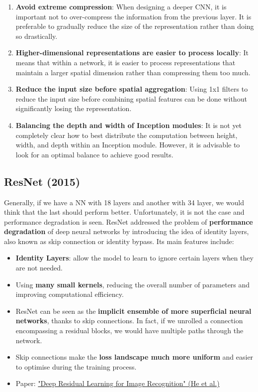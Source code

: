 \begin{enumerate}
    \item \textbf{Avoid extreme compression}: When designing a deeper CNN, it is important not to over-compress the information from the previous layer. It is preferable to gradually reduce the size of the representation rather than doing so drastically.

    \item \textbf{Higher-dimensional representations are easier to process locally}: It means that within a network, it is easier to process representations that maintain a larger spatial dimension rather than compressing them too much.

    \item \textbf{Reduce the input size before spatial aggregation}: Using 1x1 filters to reduce the input size before combining spatial features can be done without significantly losing the representation.

    \item \textbf{Balancing the depth and width of Inception modules}: It is not yet completely clear how to best distribute the computation between height, width, and depth within an Inception module. However, it is advisable to look for an optimal balance to achieve good results.
\end{enumerate}

\subsection{ResNet (2015)}

Generally, if we have a NN with 18 layers and another with 34 layer, we would think that the last should perform better. Unfortunately, it is not the case and performance degradation is seen. ResNet addressed the problem of \textbf{performance degradation} of deep neural networks by introducing the idea of identity layers, also known as skip connection or identity bypass. Its main features include:
\begin{itemize}
    \item \textbf{Identity Layers}: allow the model to learn to ignore certain layers when they are not needed.
    \item Using \textbf{many small kernels}, reducing the overall number of parameters and improving computational efficiency.
    \item ResNet can be seen as the \textbf{implicit ensemble of more superficial neural networks}, thanks to skip connections. In fact, if we unrolled a connection encompassing a residual blocks, we would have multiple paths through the network.
    \item Skip connections make the \textbf{loss landscape much more uniform} and easier to optimise during the training process.
    \item Paper: \href{https://arxiv.org/pdf/1512.03385.pdf}{"Deep Residual Learning for Image Recognition" (He et al.)}
\end{itemize}

